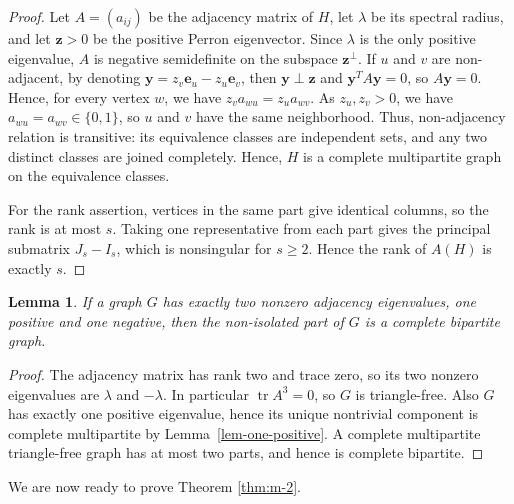 \documentclass[10pt,a4paper]{amsart}
\newtheorem{lemma}[theorem]{Lemma}
\renewcommand{\ge}{\geqslant}
\begin{document}
\begin{proof}
Let $A=(a_{ij})$ be the adjacency matrix of $H$, let $\lambda$ be its spectral radius, and let $\bm{z}>0$ be the positive Perron eigenvector. Since $\lambda$ is the only positive eigenvalue, 
$A$ is negative semidefinite on the subspace $\bm{z}^\perp$. 
If $u$ and $v$ are non-adjacent, by denoting $\bm{y}=z_v \bm{e}_u-z_u \bm{e}_v$,  
then $\bm{y} \perp \bm{z}$ and $\bm{y}^T A \bm{y}=0$, so $A\bm{y}=0$. Hence, for every vertex $w$, we have $z_v a_{wu}=z_u a_{wv}$. 
As \(z_u,z_v>0\), we have $a_{wu}=a_{wv}\in\{0,1\}$, so 
 $u$ and $v$ have the same neighborhood. 
Thus, non-adjacency relation is transitive: 
its equivalence classes are independent sets, and any two distinct classes are joined completely. Hence, \(H\) is a
complete multipartite graph on the equivalence classes.

For the rank assertion, vertices in the same part give identical columns, so the rank is at
most $s$. Taking one representative from each part gives the principal submatrix $J_s -I_s$, which is nonsingular for $s\ge 2$. Hence the rank of $A(H)$ is exactly $s$.
\end{proof} 

\begin{lemma}\label{lem:rank-two-bipartite}
If a graph \(G\) has exactly two nonzero adjacency eigenvalues, one positive
and one negative, then the non-isolated part of \(G\) is a complete bipartite
graph.
\end{lemma}

\begin{proof}
The adjacency matrix has rank two and trace zero, so its two nonzero eigenvalues
are \(\lambda\) and \(-\lambda\). In particular \(\operatorname{tr}A^3=0\), so
\(G\) is triangle-free. Also \(G\) has exactly one positive eigenvalue, hence
its unique nontrivial component is complete multipartite by
Lemma~\ref{lem-one-positive}. A complete multipartite triangle-free graph has
at most two parts, and hence is complete bipartite.
\end{proof}


We are now ready to prove Theorem \ref{thm:m-2}. 
\end{document}
